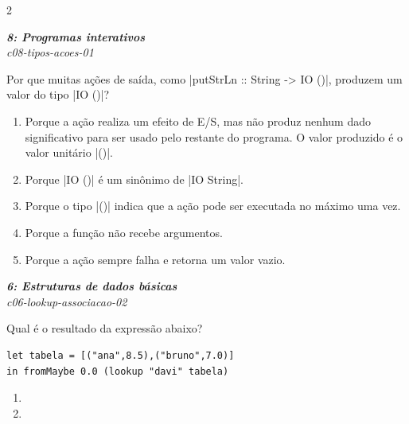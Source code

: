 \documentclass[a4paper,10pt,brazil]{article}
\begin{document}
\begin{multicols}{2}
\begin{enumerate}
\end{enumerate}

\begin{flushright}
  \footnotesize
  \textit{\textbf{8: Programas interativos}}\\
  \textit{c08-tipos-acoes-01}\\

\end{flushright}
Por que muitas ações de saída, como \haskellinline|putStrLn :: String -> IO ()|, produzem um valor do tipo \haskellinline|IO ()|?

\begin{enumerate}
  \item Porque a ação realiza um efeito de E/S, mas não produz nenhum dado significativo para ser usado pelo restante do programa. O valor produzido é o valor unitário \haskellinline|()|.

  \item Porque \haskellinline|IO ()| é um sinônimo de \haskellinline|IO String|.

  \item Porque o tipo \haskellinline|()| indica que a ação pode ser executada no máximo uma vez.

  \item Porque a função não recebe argumentos.

  \item Porque a ação sempre falha e retorna um valor vazio.


\end{enumerate}

\begin{flushright}
  \footnotesize
  \textit{\textbf{6: Estruturas de dados básicas}}\\
  \textit{c06-lookup-associacao-02}\\

\end{flushright}
Qual é o resultado da expressão abaixo?
\begin{verbatim}
let tabela = [("ana",8.5),("bruno",7.0)]
in fromMaybe 0.0 (lookup "davi" tabela)
\end{verbatim}

\begin{enumerate}
  \item {}

  \item {}


\end{enumerate}
\end{multicols}
\end{document}
